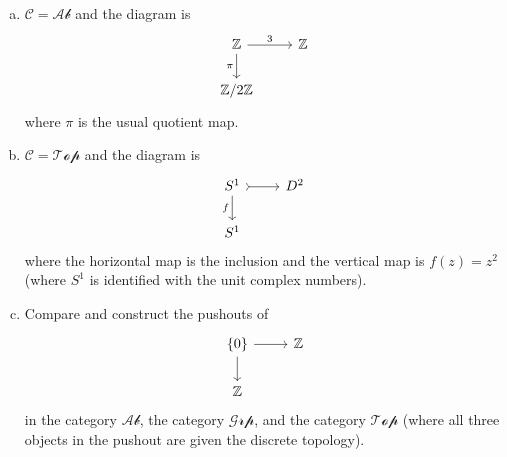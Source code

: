 \documentclass[a4paper, 12pt]{article}
\begin{document}
\begin{problem}
\begin{enumerate}[(a)]
\item \(\mathcal{C}=\mathcal{Ab}\) and the diagram is 
\[\begin{tikzcd}
	{\mathbb{Z}} & {\mathbb{Z}} \\
	{\mathbb{Z}/2 \mathbb{Z}}
	\arrow["3", from=1-1, to=1-2]
	\arrow["\pi"', from=1-1, to=2-1]
\end{tikzcd}\]
where \(\pi\) is the usual quotient map. 
\item \(\mathcal{C}=\mathcal{Top}\) and the diagram is 
\[\begin{tikzcd}
	{S^1} & {D^2} \\
	{S^1}
	\arrow[tail, from=1-1, to=1-2]
	\arrow["f"', from=1-1, to=2-1]
\end{tikzcd}\]
where the horizontal map is the inclusion and the vertical map is \(f(z)=z^2\) (where \(S^1\) is identified with the unit complex numbers).
\item Compare and construct the pushouts of 
\[\begin{tikzcd}
	{\left\{0\right\}} & {\mathbb{Z}} \\
	{\mathbb{Z}}
	\arrow[from=1-1, to=1-2]
	\arrow[from=1-1, to=2-1]
\end{tikzcd}\]
in the category \(\mathcal{Ab}\), the category \(\mathcal{Grp}\), and the category \(\mathcal{Top}\) (where all three objects in the pushout are given the discrete topology).
\end{enumerate}    
\end{problem}
\end{document}
